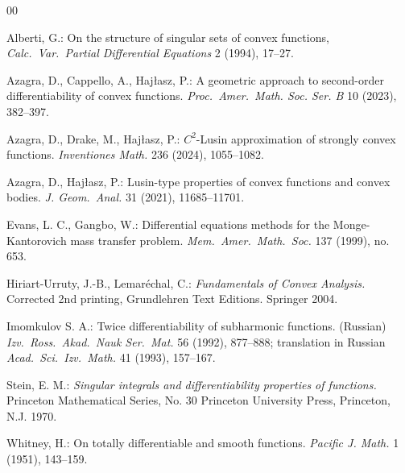 \documentclass[intlimits,12pt,reqno]{amsart}
\theoremstyle{definition}
\begin{document}
\begin{thebibliography}{00}
\frenchspacing
\setlength{\parskip}{0pt}
\setlength{\itemsep}{1 pt plus 0.5 pt minus 0.5 pt}

{\sc Alberti, G.:} On the structure of singular sets of convex functions,
{\em Calc.\ Var.\ Partial Differential Equations} 2 (1994), 17--27.


{\sc Azagra, D., Cappello, A., Haj\l{}asz, P.:}
A geometric approach to second-order differentiability of convex functions.
{\em Proc.\ Amer.\ Math. Soc. Ser. B} 10 (2023), 382--397.

{\sc Azagra, D., Drake, M., Haj\l{}asz, P.:}
$C^2$-Lusin approximation of strongly convex functions. {\em Inventiones Math.} 236 (2024), 1055--1082.

{\sc Azagra, D., Haj\l{}asz, P.:}
Lusin-type properties of convex functions and convex bodies.
{\em J. Geom.\ Anal.} 31 (2021), 11685--11701.



{\sc Evans, L. C., Gangbo, W.:} Differential equations methods for the Monge-Kantorovich mass transfer problem. {\em Mem.\ Amer.\ Math.\ Soc.} 137 (1999), no. 653.


{\sc Hiriart-Urruty, J.-B., Lemar\'echal, C.:} {\em Fundamentals of Convex Analysis.} Corrected 2nd printing, {Grundlehren Text Editions}. Springer 2004.

{\sc Imomkulov S. A.:} Twice differentiability of subharmonic
  functions. (Russian) {\em Izv.\ Ross.\ Akad.\ Nauk Ser.\ Mat.} 56 (1992),
877--888; translation in Russian {\em Acad.\ Sci.\ Izv.\ Math.} 41 (1993),
157--167.

{\sc Stein, E. M.:} {\em Singular integrals and differentiability properties of functions.} Princeton Mathematical Series, No. 30 Princeton University Press, Princeton, N.J. 1970.


{\sc Whitney, H.:}
On totally differentiable and smooth functions.
{\em Pacific J. Math.} 1 (1951), 143--159.




\end{thebibliography}
\end{document}
